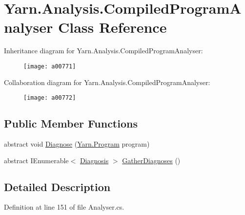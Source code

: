 \hypertarget{a00053}{\section{Yarn.\-Analysis.\-Compiled\-Program\-Analyser Class Reference}
\label{a00053}
}


Inheritance diagram for Yarn.\-Analysis.\-Compiled\-Program\-Analyser\-:
\nopagebreak
\begin{figure}[H]
\begin{center}
\leavevmode
\texttt{[image: a00771]}
\end{center}
\end{figure}


Collaboration diagram for Yarn.\-Analysis.\-Compiled\-Program\-Analyser\-:
\nopagebreak
\begin{figure}[H]
\begin{center}
\leavevmode
\texttt{[image: a00772]}
\end{center}
\end{figure}
\subsection*{Public Member Functions}
\begin{DoxyCompactItemize}
\item 
abstract void \hyperlink{a00053_aba4a36cb823b11ee491074e26477d084}{Diagnose} (\hyperlink{a00152}{Yarn.\-Program} program)
\item 
abstract I\-Enumerable$<$ \hyperlink{a00091}{Diagnosis} $>$ \hyperlink{a00053_afe059a2ceeabe50380b000420e512bd6}{Gather\-Diagnoses} ()
\end{DoxyCompactItemize}


\subsection{Detailed Description}


Definition at line 151 of file Analyser.\-cs.



